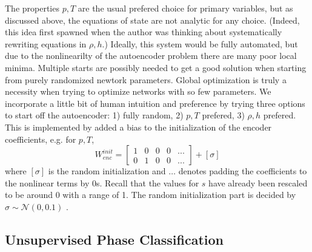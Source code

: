 \documentclass[]{article}
\begin{document}
The properties \(p,T\) are the usual prefered choice for primary
variables, but as discussed above, the equations of state are not
analytic for any choice. (Indeed, this idea first spawned when the
author was thinking about systematically rewriting equations in
\(\rho,h\).) Ideally, this system would be fully automated, but due to
the nonlinearilty of the autoencoder problem there are many poor local minima.
Multiple starts are possibly needed
to get a good solution when starting from purely randomized newtork
parameters. Global optimization is truly a necessity when trying to
optimize networks with so few parameters. We incorporate a little bit of
human intuition and preference by trying three options to start off the
autoencoder: 1) fully random, 2) \(p,T\) prefered, 3) \(\rho,h\)
prefered. This is implemented by added a bias to the initialization of
the encoder coefficients, e.g. for \(p,T\),
\begin{equation}
 W^{init}_{enc} = \left[\begin{array}{ccccc}
1 & 0 & 0 & 0 & ... \\
0 & 1 & 0 & 0 & ...
                        \end{array}\right]+[\sigma]
\end{equation}
where \([\sigma]\) is the random initialization and \(…\) denotes
padding the coefficients to the nonlinear terms by 0s. Recall that the
values for \(s\) have already been rescaled to be around 0 with a range
of 1. The random initialization part is decided by
\(\sigma \sim \mathcal{N}(0,0.1)\) .

\hypertarget{header-n3317}{%
\subsection{Unsupervised Phase Classification}\label{header-n3317}}
\end{document}
